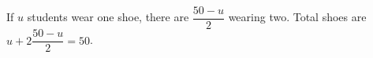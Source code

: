 If $u$ students wear one shoe, there are $\dfrac{50-u}{2}$ wearing two. Total shoes are $u+2\dfrac{50-u}{2}=\boxed{50}$.
